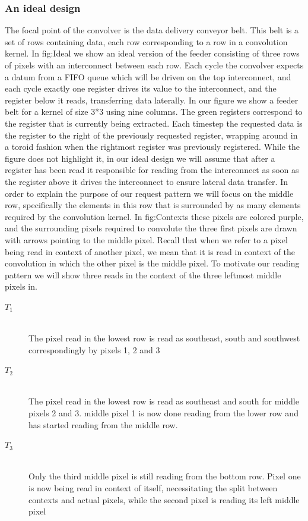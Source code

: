\subsubsection{An ideal design}
The focal point of the convolver is the data delivery conveyor belt. This belt is a set of rows containing data, each row corresponding to a row in a convolution kernel.
In fig:Ideal we show an ideal version of the feeder consisting of three rows of pixels with an interconnect between each row.
Each cycle the convolver expects a datum from a FIFO queue which will be driven on the top interconnect, and each cycle exactly one register drives its value to the interconnect, and the register below it reads, transferring data laterally.
In our figure we show a feeder belt for a kernel of size 3*3 using nine columns. The green registers correspond to the register that is currently being extracted.
Each timestep the requested data is the register to the right of the previously requested register, wrapping around in a toroid fashion when the rightmost register was previously registered.
While the figure does not highlight it, in our ideal design we will assume that after a register has been read it responsible for reading from the interconnect as soon as the register above it drives the interconnect to ensure lateral data transfer.
In order to explain the purpose of our request pattern we will focus on the middle row, specifically the elements in this row that is surrounded by as many elements required by the convolution kernel.
In fig:Contexts these pixels are colored purple, and the surrounding pixels required to convolute the three first pixels are drawn with arrows pointing to the middle pixel.
Recall that when we refer to a pixel being read in context of another pixel, we mean that it is read in context of the convolution in which the other pixel is the middle pixel.
To motivate our reading pattern we will show three reads in the context of the three leftmost middle pixels in.
\begin{description}
  \item[$T_{1}$] \hfill \\
  The pixel read in the lowest row is read as southeast, south and southwest correspondingly by pixels 1, 2 and 3
  \item[$T_{2}$] \hfill \\
  The pixel read in the lowest row is read as southeast and south for middle pixels 2 and 3. middle pixel 1 is now done reading from the lower row and has started reading from the middle row.
  \item[$T_{3}$] \hfill \\
  Only the third middle pixel is still reading from the bottom row. Pixel one is now being read in context of itself, necessitating the split between contexts and actual pixels, while the second pixel is reading its left middle pixel
\end{description}
